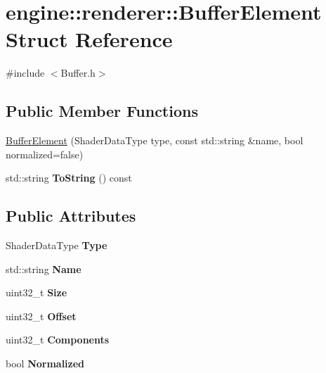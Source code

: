 \hypertarget{structengine_1_1renderer_1_1BufferElement}{}\section{engine\+:\+:renderer\+:\+:Buffer\+Element Struct Reference}
\label{structengine_1_1renderer_1_1BufferElement}


{\ttfamily \#include $<$Buffer.\+h$>$}

\subsection*{Public Member Functions}
\begin{DoxyCompactItemize}
\item 
\hyperlink{structengine_1_1renderer_1_1BufferElement_a76049a787d70b0adf984e65a9994bc1d}{Buffer\+Element} (Shader\+Data\+Type type, const std\+::string \&name, bool normalized=false)
\item 
\mbox{\label{structengine_1_1renderer_1_1BufferElement_a577994a84ccd055e3ec24655bb011689}} 
std\+::string {\bfseries To\+String} () const
\end{DoxyCompactItemize}
\subsection*{Public Attributes}
\begin{DoxyCompactItemize}
\item 
\mbox{\label{structengine_1_1renderer_1_1BufferElement_ad15963c4b3ba16476cce390f77bcb549}} 
Shader\+Data\+Type {\bfseries Type}
\item 
\mbox{\label{structengine_1_1renderer_1_1BufferElement_a4d15f927313a59f54d234c435a254fb8}} 
std\+::string {\bfseries Name}
\item 
\mbox{\label{structengine_1_1renderer_1_1BufferElement_aa56181d65756cf32e9c3957bad71c2c1}} 
uint32\+\_\+t {\bfseries Size}
\item 
\mbox{\label{structengine_1_1renderer_1_1BufferElement_acbe3158f166940f1b6a0c9f1add6e028}} 
uint32\+\_\+t {\bfseries Offset}
\item 
\mbox{\label{structengine_1_1renderer_1_1BufferElement_aa67fb27da8ee0faae62a142614a537ff}} 
uint32\+\_\+t {\bfseries Components}
\item 
\mbox{\label{structengine_1_1renderer_1_1BufferElement_ae6515d1eab82fff649da068b2ae863c0}} 
bool {\bfseries Normalized}
\end{DoxyCompactItemize}


